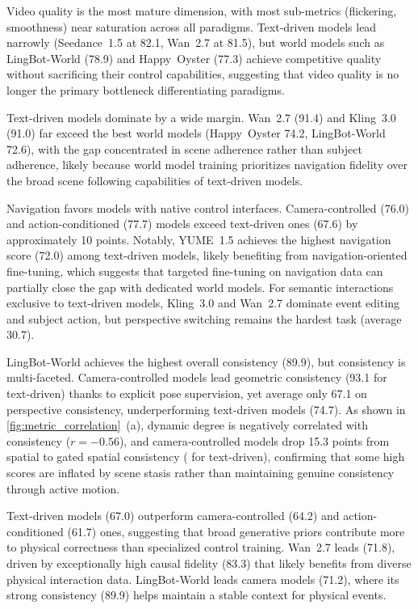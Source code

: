 Video quality is the most mature dimension, with most sub-metrics (flickering, smoothness) near saturation across all paradigms. Text-driven models lead narrowly (Seedance~1.5 at 82.1, Wan~2.7 at 81.5), but world models such as LingBot-World (78.9) and Happy~Oyster (77.3) achieve competitive quality without sacrificing their control capabilities, suggesting that video quality is no longer the primary bottleneck differentiating paradigms.

Text-driven models dominate by a wide margin. Wan~2.7 (91.4) and Kling~3.0 (91.0) far exceed the best world models (Happy~Oyster 74.2, LingBot-World 72.6), with the gap concentrated in scene adherence rather than subject adherence, likely because world model training prioritizes navigation fidelity over the broad scene following capabilities of text-driven models.

Navigation favors models with native control interfaces. Camera-controlled (76.0) and action-conditioned (77.7) models exceed text-driven ones (67.6) by approximately 10 points. Notably, YUME~1.5 achieves the highest navigation score (72.0) among text-driven models, likely benefiting from navigation-oriented fine-tuning, which suggests that targeted fine-tuning on navigation data can partially close the gap with dedicated world models. For semantic interactions exclusive to text-driven models, Kling~3.0 and Wan~2.7 dominate event editing and subject action, but perspective switching remains the hardest task (average 30.7).

LingBot-World achieves the highest overall consistency (89.9), but consistency is multi-faceted. Camera-controlled models lead geometric consistency (93.1  for text-driven) thanks to explicit pose supervision, yet average only 67.1 on perspective consistency, underperforming text-driven models (74.7). As shown in \cref{fig:metric_correlation}~(a), dynamic degree is negatively correlated with consistency ($r{=}{-}0.56$), and camera-controlled models drop 15.3 points from spatial to gated spatial consistency ( for text-driven), confirming that some high scores are inflated by scene stasis rather than maintaining genuine consistency through active motion.

Text-driven models (67.0) outperform camera-controlled (64.2) and action-conditioned (61.7) ones, suggesting that broad generative priors contribute more to physical correctness than specialized control training. Wan~2.7 leads (71.8), driven by exceptionally high causal fidelity (83.3) that likely benefits from diverse physical interaction data. LingBot-World leads camera models (71.2), where its strong consistency (89.9) helps maintain a stable context for physical events.

